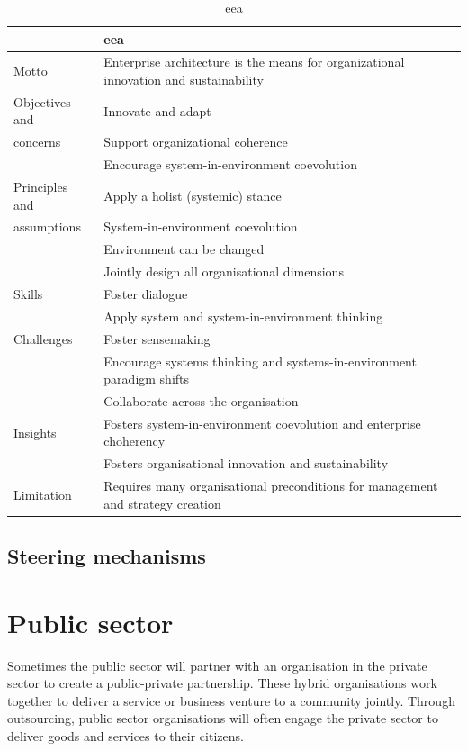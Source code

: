 \begin{longtable}{p{}p{}}
	\toprule
	& \textbf{\acrlong{eea}} \\ \midrule%
	\endhead%
	\hline
	\caption{\acrlong{eea}}
	\label{tab:eaeea}	
	\endfoot%
	Motto    		& Enterprise architecture is the means for organizational innovation and sustainability \\
	Objectives and 	& Innovate and adapt    \\
	concerns		& Support organizational coherence \\
					& Encourage system-in-environment coevolution \\
	Principles and  & Apply a holist (systemic) stance \\
	assumptions		& System-in-environment coevolution  \\
					& Environment can be changed \\
					& Jointly design all organisational dimensions \\
	Skills 			& Foster dialogue \\
					& Apply system and system-in-environment thinking \\
	Challenges		& Foster sensemaking \\
					& Encourage systems thinking and systems-in-environment paradigm shifts \\
					& Collaborate across the organisation \\
	Insights		& Fosters system-in-environment coevolution and enterprise choherency \\
					& Fosters organisational innovation and sustainability \\
	Limitation		& Requires many organisational preconditions for management and strategy creation \\
	\bottomrule
\end{longtable}

\subsection{Steering mechanisms}
\label{sub:tbeasteering}

\section{Public sector}
\label{sec:tbpsmarket}
Sometimes the public sector will partner with an organisation in the private sector to create a public-private partnership. These hybrid organisations work together to deliver a service or business venture to a community jointly. Through outsourcing, public sector organisations will often engage the private sector to deliver goods and services to their citizens. 

